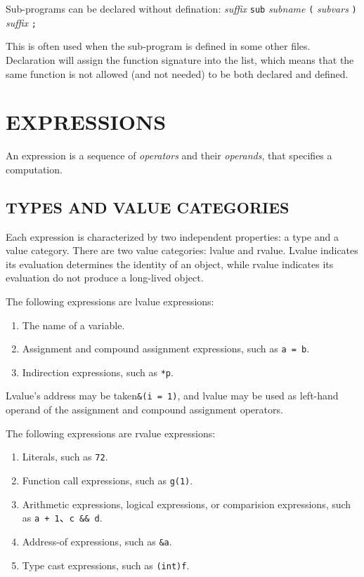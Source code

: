 \documentclass{article}
\begin{document}
Sub-programs can be declared without defination: \textit{suffix} \verb|sub| \textit{subname} \verb|(| \textit{subvars} \verb|)| \textit{suffix} \verb|;|

This is often used when the sub-program is defined in some other files. Declaration will assign the function signature into the list, which means that the same function is not allowed (and not needed) to be both declared and defined.

\section{EXPRESSIONS}

An expression is a sequence of \textit{operators} and their \textit{operands}, that specifies a computation.

\subsection{TYPES AND VALUE CATEGORIES}

Each expression is characterized by two independent properties: a type and a value category. There are two value categories: lvalue and rvalue. Lvalue indicates its evaluation determines the identity of an object, while rvalue indicates its evaluation do not produce a long-lived object.

The following expressions are lvalue expressions:
\begin{enumerate}
	\item The name of a variable.
	\item Assignment and compound assignment expressions, such as \verb|a = b|.
	\item Indirection expressions, such as \verb|*p|.
\end{enumerate}

Lvalue's address may be taken\verb|&(i = 1)|, and lvalue may be used as left-hand operand of the assignment and compound assignment operators.

The following expressions are rvalue expressions:
\begin{enumerate}
	\item Literals, such as \verb|72|.
	\item Function call expressions, such as \verb|g(1)|.
	\item Arithmetic expressions, logical expressions, or comparision expressions, such as \verb|a + 1|、\verb|c && d|.
	\item Address-of expressions, such as \verb|&a|.
	\item Type cast expressions, such as \verb|(int)f|.
\end{enumerate}
\end{document}
